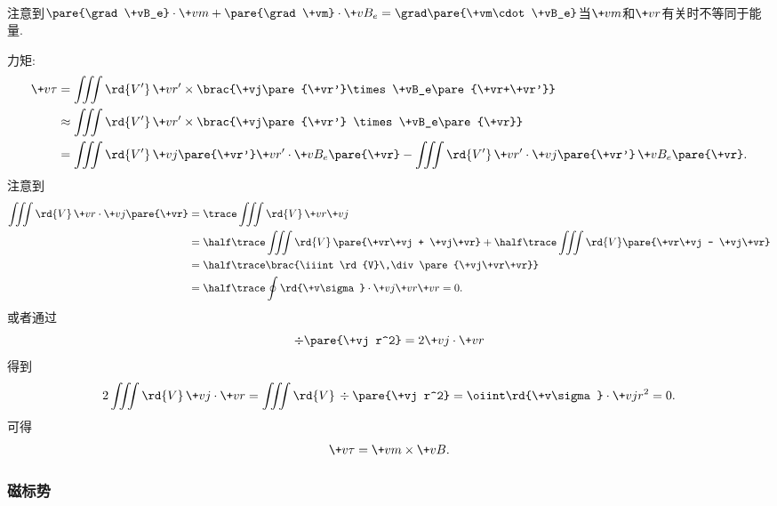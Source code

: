 \documentclass[hidelinks]{ctexart}
\begin{document}
\begin{cenum}
\begin{cenum}
\begin{align*}
        \end{align*}
        注意到$\pare{\grad \+vB_e}\cdot \+vm + \pare{\grad \+vm}\cdot \+vB_e = \grad\pare{\+vm\cdot \+vB_e}$当$\+vm$和$\+vr$有关时不等同于能量.
        \item 力矩:
        \begin{align*}
            \+v\tau &= \iiint \rd{V'}\, \+vr' \times \brac{\+vj\pare{\+vr'}\times \+vB_e\pare{\+vr+\+vr'}} \\
            &\approx \iiint \rd{V'}\, \+vr' \times \brac{\+vj\pare{\+vr'} \times \+vB_e\pare{\+vr}} \\
            &= \iiint \rd{V'}\, \+vj\pare{\+vr'}\+vr'\cdot \+vB_e\pare{\+vr} - \iiint \rd{V'}\, \+vr'\cdot \+vj\pare{\+vr'}\, \+vB_e\pare{\+vr}.
        \end{align*}
        注意到
        \begin{align*}
            \iiint \rd{V}\, \+vr\cdot \+vj\pare{\+vr} &= \trace \iiint \rd{V}\, \+vr\+vj \\
            &= \half \trace \iiint \rd{V}\,\pare{\+vr\+vj + \+vj\+vr} + \half \trace \iiint \rd{V} \pare{\+vr\+vj - \+vj\+vr} \\
            &= \half \trace\brac{\iiint \rd{V}\,\div\pare{\+vj\+vr\+vr}} \\
            &= \half \trace \oint \rd{\+v\sigma}\cdot \+vj\+vr\+vr = 0.
        \end{align*}
        或者通过
        \[ \div\pare{\+vj r^2} = 2\+vj\cdot \+vr \]
        得到
        \[ 2\iiint \rd{V}\, \+vj\cdot \+vr = \iiint \rd{V}\, \div \pare{\+vj r^2} = \oiint \rd{\+v\sigma}\cdot \+vj r^2= 0. \]
        可得
        \[ \+v\tau = \+vm\times \+vB. \]
    \end{cenum}
\end{cenum}


\subsubsection{磁标势} %
\label{ssub:磁标势}
\end{document}

